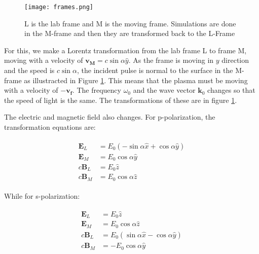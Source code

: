 \begin{figure}[H]
    \centering
    \texttt{[image: frames.png]}
    \centering
    \caption{L is the lab frame and M is the moving frame. Simulations are done in the M-frame and then they are transformed back to the L-Frame}
    \label{fig:frames}
\end{figure}


For this, we make a Lorentz transformation from the lab frame L to frame M, moving with a velocity of $\mathbf{v_M} = c\sin\alpha \hat{y}$. As the frame is moving in $y$ direction and the speed is $c\sin\alpha$, the incident pulse is normal to the surface in the M-frame as illustracted in Figure \ref{fig:frames}. This means that the plasma must be moving with a velocity of $-\mathbf{v_f}$. The frequency $\omega_0$ and the wave vector $\mathbf{k}_0$ changes so that the speed of light is the same. The transformations of these are in figure \ref{fig:frames}.

The electric and magnetic field also changes. For p-polarization, the transformation equations are:

\begin{align}
    \label{eq:field-p}
    \begin{split}
        \mathbf{E}_L  & = E_0(-\sin\alpha \hat{x} + \cos\alpha \hat{y}) \\
        \mathbf{E}_M  & = E_0\cos\alpha \hat{y}                         \\
        c\mathbf{B}_L & = E_0\hat{z}                                    \\
        c\mathbf{B}_M & = E_0\cos\alpha \hat{z}
    \end{split}
\end{align}

While for s-polarization:

\begin{align}
    \label{eq:field-s}
    \begin{split}
        \mathbf{E}_L & = E_0\hat{z}                                    \\
        \mathbf{E}_M & = E_0\cos\alpha \hat{z}                        \\
        c\mathbf{B}_L & = E_0(\sin\alpha \hat{x} - \cos\alpha \hat{y}) \\
        c\mathbf{B}_M & = -E_0\cos\alpha \hat{y}
    \end{split}
\end{align}

